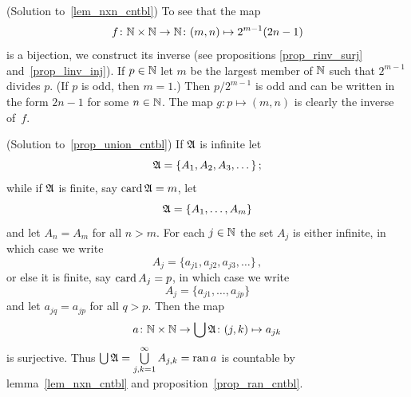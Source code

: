 \begin{prf}\label{sol_lem_nxn_cntbl}(Solution to~\ref{lem_nxn_cntbl})
To see that the map
  \[ f \colon \mathbb{N} \times \mathbb{N} \rightarrow \mathbb{N} \colon (m,n) \mapsto 2^{m-1}(2n - 1) \]
is a bijection, we construct its inverse (see propositions \ref{prop_rinv_surj}
and~\ref{prop_linv_inj}).  If $p \in \mathbb{N}$ let $m$ be the largest member of $\mathbb{N}$ such that
$2^{m-1}$ divides $p$. (If $p$ is odd, then $m=1$.) Then $p/2^{m-1}$ is odd and can be written
in the form $2n-1$ for some $n \in \mathbb{N}$. The map $g \colon p \mapsto (m,n)$ is clearly the
inverse of~$f$.
\end{prf}

\begin{prf}\label{sol_prop_union_cntbl}(Solution to~\ref{prop_union_cntbl})
If $\mathfrak{A}$ is infinite let
  \[ \mathfrak{A} = \{A_1,A_2,A_3, \dots\}\,; \]
while if $\mathfrak{A}$ is finite, say $\operatorname{card}\mathfrak{A} = m$, let
  \[ \mathfrak{A} = \{A_1, \dots,A_m\} \]
and let $A_n = A_m$ for all $n > m$.  For each $j \in \mathbb{N}$ the set $A_j$ is either infinite, in
which case we write
  \[ A_j = \{a_{j1},a_{j2}, a_{j3},\dots\}\,, \]
or else it is finite, say $\operatorname{card} A_j = p$, in which case we write
  \[ A_j = \{a_{j1},\dots,a_{jp}\} \]
and let $a_{jq} = a_{jp}$ for all $q > p$.  Then the map
  \[a \colon \mathbb{N} \times \mathbb{N} \rightarrow \bigcup\mathfrak{A} \colon (j,k) \mapsto a_{jk} \]
is surjective.  Thus $\bigcup\mathfrak{A} = \bigcup\limits_{j,k=1}^\infty A_{j,k} = \operatorname{ran} a$ is
countable by lemma~\ref{lem_nxn_cntbl} and proposition~\ref{prop_ran_cntbl}.
\end{prf}





\endinput
